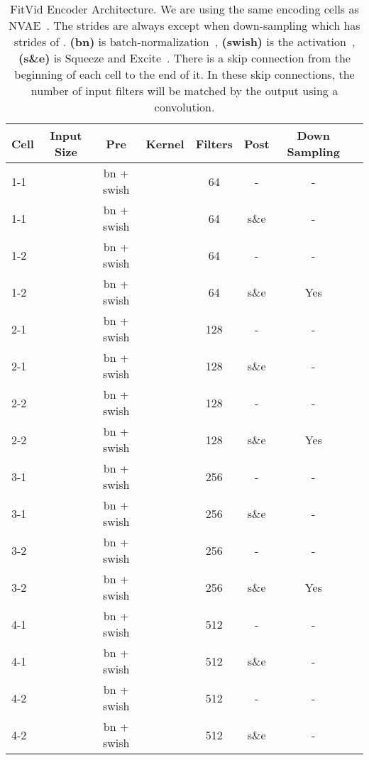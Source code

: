 \documentclass{article}
\newcommand{\model}{FitVid\xspace}
\begin{document}
\begin{table}[!htp]\centering
\caption{\model Encoder Architecture. We are using the same encoding cells as NVAE~\cite{vahdat2020nvae}. The strides are always  except when down-sampling which has strides of . \textbf{(bn)} is batch-normalization~\cite{ioffe2015batch}, \textbf{(swish)} is the activation~\cite{ramachandran2017searching}, \textbf{(s\&e)} is Squeeze and Excite~\cite{hu2018squeeze}. There is a skip connection from the beginning of each cell to the end of it. In these skip connections, the number of input filters will be matched by the output using a  convolution.}
\label{tab:encoder}
\scriptsize
\begin{tabular}{lccccccc}\toprule
Cell &Input Size &Pre &Kernel &Filters &Post &Down Sampling \\\midrule
1-1 & &bn + swish & &64 &- &- \\
1-1 & &bn + swish & &64 &s\&e &- \\
1-2 & &bn + swish & &64 &- &- \\
1-2 & &bn + swish & &64 &s\&e &Yes \\
2-1 & &bn + swish & &128 &- &- \\
2-1 & &bn + swish & &128 &s\&e &- \\
2-2 & &bn + swish & &128 &- &- \\
2-2 & &bn + swish & &128 &s\&e &Yes \\
3-1 & &bn + swish & &256 &- &- \\
3-1 & &bn + swish & &256 &s\&e &- \\
3-2 & &bn + swish & &256 &- &- \\
3-2 & &bn + swish & &256 &s\&e &Yes \\
4-1 & &bn + swish & &512 &- &- \\
4-1 & &bn + swish & &512 &s\&e &- \\
4-2 & &bn + swish & &512 &- &- \\
4-2 & &bn + swish & &512 &s\&e &- \\
\bottomrule
\end{tabular}
\end{table}
\end{document}
